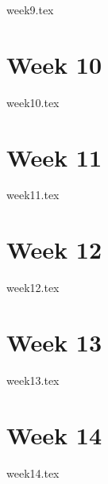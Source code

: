 \documentclass{report}
\begin{document}
{week9.tex}

\chapter{Week 10}

{week10.tex}

\chapter{Week 11}

{week11.tex}

\chapter{Week 12}

{week12.tex}

\chapter{Week 13}

{week13.tex}

\chapter{Week 14}

{week14.tex}
\end{document}

